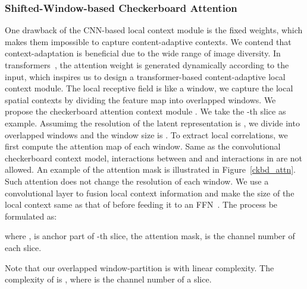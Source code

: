 \documentclass[sigconf]{acmart}
\begin{document}
\subsubsection{Shifted-Window-based Checkerboard Attention}
One drawback of the CNN-based local context module is the fixed weights,
which makes them impossible to capture content-adaptive contexts.
We contend that context-adaptation is beneficial due to the wide range of image diversity.
In transformers~\cite{DBLP:conf/nips/VaswaniSPUJGKP17, DBLP:conf/iccv/LiuL00W0LG21},
the attention weight is generated dynamically according to the input,
which inspires us to design a transformer-based content-adaptive local context module.
The local receptive field is like a window,
we capture the local spatial contexts by dividing the feature map into overlapped windows.
We propose the checkerboard attention context module .
We take the -th slice as example.
Assumimg the resolution of the latent representation  is ,
we divide 
into  overlapped windows and the window size is .
To extract local correlations, we first compute the attention map of each window.
Same as the convolutional checkerboard context model, interactions between  and 
and interactions in  are not allowed. An example of the attention mask is illustrated
in Figure~\ref{ckbd_attn}. Such attention does not change the resolution of each window.
We use a  convolutional layer to fusion local context information and
make the size of the local context same as that of  before feeding
it to an FFN~\cite{DBLP:conf/nips/VaswaniSPUJGKP17}. The process be formulated as:



where ,
 is anchor part of -th slice,  the attention mask,
 is the channel number of each slice.\par
Note that our overlapped window-partition is with linear complexity.
The complexity of  is ,
where  is the channel number of a slice.
\end{document}
